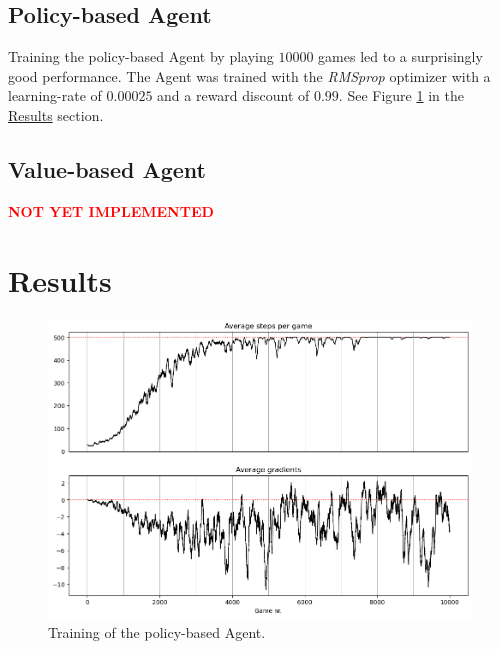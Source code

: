 \documentclass{article}
\renewenvironment{leftbar}[1][\hsize]{
    \def\FrameCommand{{\color{barcolor}\vrule width 0.5pt \hspace{10pt}}}
    \MakeFramed{\hsize#1 \advance\hsize-\width \FrameRestore}
}{\endMakeFramed}
\begin{document}
\subsection*{Policy-based Agent}
\begin{leftbar}
    Training the policy-based Agent by playing $10 000$ games led to a surprisingly good performance. The Agent was trained with the \textit{RMSprop} optimizer with a learning-rate of $0.00025$ and a reward discount of $0.99$. See Figure \ref{fig:policy-based-metrics} in the \hyperlink{sec:results}{Results} section.
\end{leftbar}
\subsection*{Value-based Agent}
\begin{leftbar}
    \textbf{\textcolor{red}{NOT YET IMPLEMENTED}}
\end{leftbar}

\newpage
\hypertarget{sec:results}{}
\section*{Results}

\begin{figure}[h]
    \centering
    \includegraphics[width=15cm]{../images/policy-based-metrics.png}
    \caption{Training of the policy-based Agent.}
    \label{fig:policy-based-metrics}
\end{figure}

\newpage
\printbibliography
\end{document}
